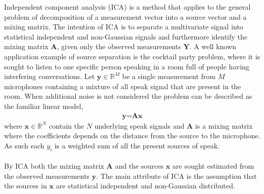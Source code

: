 Independent component analysis (ICA) is a method that applies to  the general problem of decomposition of a measurement vector into a source vector and a mixing matrix. The intention of ICA is to separate a multivariate signal into statistical independent and non-Gaussian signals and furthermore identify the mixing matrix $\textbf{A}$, given only the observed measurements $\textbf{Y}$.
A well known application example of source separation is the cocktail party problem, where it is sought to listen to one specific person speaking in a room full of people having interfering conversations. 
Let $\textbf{y}\in \mathbb{R}^{M}$ be a single measurement from $M$ microphones containing a mixture of all speak signal that are present in the room. When additional noise is not considered the problem can be described as the familiar linear model, 
\begin{align*}
\textbf{y}=\textbf{Ax}
\end{align*}
where $\textbf{x}\in \mathbb{R}^{N}$ contain the $N$ underlying speak signals and $\textbf{A}$ is a mixing matrix where the coefficients depends on the distance from the source to the microphone. As such each $y_i$ is a weighted sum of all the present sources of speak.
\\ \\
By ICA both the mixing matrix $\textbf{A}$ and the sources $\textbf{x}$ are sought estimated from the observed measurements $\textbf{y}$. The main attribute of ICA is the assumption that the sources in $\textbf{x}$ are statistical independent and non-Gaussian distributed.\\     

